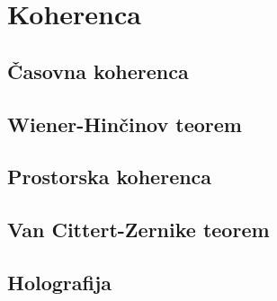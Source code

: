 
\chapter{Koherenca}
\label{chap:Koherenca}
 
\section{Časovna koherenca}
\section{Wiener-Hinčinov teorem}
\section{Prostorska koherenca}
\section{Van Cittert-Zernike teorem}
\section{Holografija}
